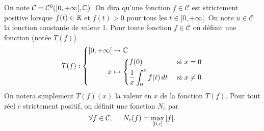 On note $\mathcal{C} = \mathcal{C}^0([0,+\infty[,\mathbb{C})$. On dira qu'une fonction $f\in \mathcal{C}$ est strictement positive lorsque $f(t)\in \mathbb{R}$ et $f(t)>0$ pour tous les $t\in [0,+\infty[$. On note $u\in \mathcal{C}$ la fonction constante de valeur $1$. Pour toute fonction $f\in \mathcal{C}$ on définit une fonction (notée $T(f)$)
\begin{displaymath}
T(f):
\left\lbrace 
  \begin{aligned}
  \left[ 0,+\infty \right[  &\rightarrow \mathbb{C} \\
  x &\mapsto
    \left\lbrace 
      \begin{aligned}
        &f(0) &\text{ si } x= 0\\
        &\frac{1}{x}\int_0^x f(t)\,dt &\text{ si } x\neq 0
      \end{aligned}
    \right.
 \end{aligned} 
\right. 
\end{displaymath}
On notera simplement $T(f)(x)$ la valeur en $x$ de la fonction $T(f)$. 
Pour tout réel $c$ strictement positif, on définit une fonction $N_c$ par 
\begin{displaymath}
 \forall f\in \mathcal{C},\hspace{0.5cm} N_c(f) = \max_{[0,c]}|f|.
\end{displaymath}

